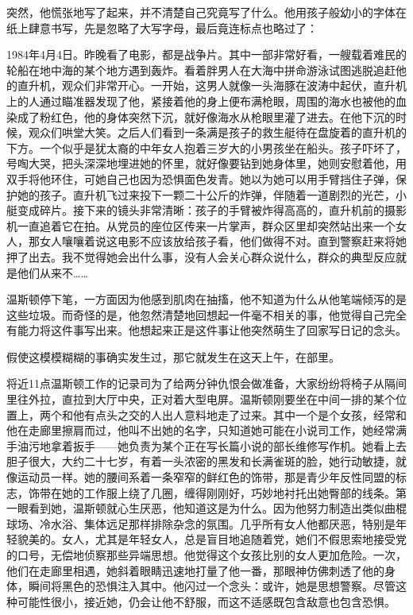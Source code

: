 突然，他慌张地写了起来，并不清楚自己究竟写了什么。他用孩子般幼小的字体在纸上肆意书写，先是忽略了大写字母，最后竟连标点也略过了：

1984年4月4日。昨晚看了电影，都是战争片。其中一部非常好看，一艘载着难民的轮船在地中海的某个地方遇到轰炸。看着胖男人在大海中拼命游泳试图逃脱追赶他的直升机，观众们非常开心。一开始，这男人就像一头海豚在波涛中起伏，直升机上的人通过瞄准器发现了他，紧接着他的身上便布满枪眼，周围的海水也被他的血染成了粉红色，他的身体突然下沉，就好像海水从枪眼里灌了进去。在他下沉的时候，观众们哄堂大笑。之后人们看到一条满是孩子的救生艇待在盘旋着的直升机的下方。一个似乎是犹太裔的中年女人抱着三岁大的小男孩坐在船头。孩子吓坏了，号啕大哭，把头深深地埋进她的怀里，就好像要钻到她身体里，她则安慰着他，用双手将他环住，可她自己也因为恐惧面色发青。她以为她可以用手臂挡住子弹，保护她的孩子。直升机飞过来投下一颗二十公斤的炸弹，伴随着一道剧烈的光芒，小艇变成碎片。接下来的镜头非常清晰：孩子的手臂被炸得高高的，直升机前的摄影机一直追着它在拍。从党员的座位区传来一片掌声，群众区里却突然站出来一个女人，那女人嚷嚷着说这电影不应该放给孩子看，他们做得不对。直到警察赶来将她押了出去。我不觉得她会出什么事，没有人会关心群众说什么，群众的典型反应就是他们从来不\ldots\ldots{}

温斯顿停下笔，一方面因为他感到肌肉在抽搐，他不知道为什么从他笔端倾泻的是这些垃圾。而奇怪的是，他忽然清楚地回想起一件毫不相关的事，他觉得自己完全有能力将这件事写出来。他想起来正是这件事让他突然萌生了回家写日记的念头。

假使这模模糊糊的事确实发生过，那它就发生在这天上午，在部里。

将近11点温斯顿工作的记录司为了给两分钟仇恨会做准备，大家纷纷将椅子从隔间里往外拉，直拉到大厅中央，正对着大型电屏。温斯顿刚要坐在中间一排的某个位置上，两个和他有点头之交的人出人意料地走了过来。其中一个是个女孩，经常和他在走廊里擦肩而过，他叫不出她的名字，只知道她可能在小说司工作，她经常满手油污地拿着扳手------她负责为某个正在写长篇小说的部长维修写作机。她看上去胆子很大，大约二十七岁，有着一头浓密的黑发和长满雀斑的脸，她行动敏捷，就像运动员一样。她的腰间系着一条窄窄的鲜红色的饰带，那是青少年反性同盟的标志，饰带在她的工作服上绕了几圈，缠得刚刚好，巧妙地衬托出她臀部的线条。第一眼看到她，温斯顿就心生厌恶，他知道这是为什么。因为他努力制造出类似曲棍球场、冷水浴、集体远足那样排除杂念的氛围。几乎所有女人他都厌恶，特别是年轻貌美的。女人，尤其是年轻女人，总是盲目地追随着党，她们不假思索地接受党的口号，无偿地侦察那些异端思想。他觉得这个女孩比别的女人更加危险。一次，他们在走廊里相遇，她斜着眼睛迅速地打量了他一番，那眼神仿佛刺透了他的身体，瞬间将黑色的恐惧注入其中。他闪过一个念头：或许，她是思想警察。尽管这种可能性很小，接近她，仍会让他不舒服，而这不适感既包含敌意也包含恐惧。


